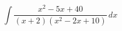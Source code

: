 \documentclass[../rgr1.tex]{subfiles}
\begin{document}
\Solution

\begin{equation}
	\int \frac{ x^2 -5x + 40 }{ (x+2) (x^2 - 2x + 10) } \, dx
\end{equation}

\Answer{
	<++>
}
\end{document}

